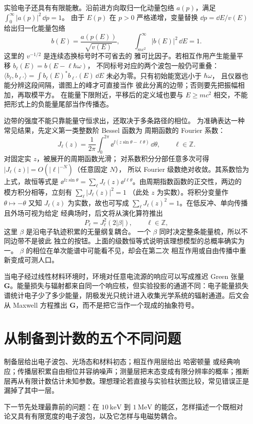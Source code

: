 实验电子还具有有限能散。沿前进方向取归一化动量包络
\(a(p)\)，满足 \(\int_0^\infty |a(p)|^2\,\dd p=1\)。
由于 \(E(p)\) 在 \(p>0\) 严格递增，变量替换
\(\dd p=\dd E/v(E)\) 给出归一化能量包络
\begin{equation}
b(E)=\frac{a(p(E))}{\sqrt{v(E)}},\qquad
\int_{mc^2}^{\infty}|b(E)|^2\,\dd E=1.
\label{eq:feqo-energy-envelope-normalization}
\end{equation}
这里的 \(v^{-1/2}\) 是连续态换标号时不可省去的
雅可比因子。若相互作用产生能量平移
\(b_\ell(E)=b(E-\ell\hbar\omega)\)，
不同标号对应的两个波包一般仍可重叠：
\(\langle b_\ell,b_{\ell'}\rangle
=\int b_\ell(E)^*b_{\ell'}(E)\,\dd E\)
未必为零。只有初始能宽远小于 \(\hbar\omega\)，
且仪器也能分辨这段间隔，谱图上的峰才可直接当作
彼此分离的边带；否则要先把振幅相加，再取模平方。
在能量下限附近，平移后的定义域也要与
\(E\ge mc^2\) 相交，不能把形式上的负能量尾部当作传播态。

边带的强度不能只靠能量守恒求出，还取决于多条路径的相位。
为准确表达一种常见结果，先定义第一类整数阶 Bessel 函数为
周期函数的 Fourier 系数：
\[
J_\ell(z)=\frac1{2\pi}\int_0^{2\pi}
\ee^{\ii(z\sin\theta-\ell\theta)}\,\dd\theta,
\qquad \ell\in\mathbb Z.
\]
对固定实 \(z\)，被展开的周期函数光滑；
对系数积分分部任意多次可得
\(|J_\ell(z)|=O(|\ell|^{-N})\)（任意固定 \(N\)），
所以 Fourier 级数绝对收敛。其系数恰为上式，故恒等式是
\(\ee^{\ii z\sin\theta}=\sum_\ell J_\ell(z)
\ee^{\ii\ell\theta}\)。由周期指数函数的正交性，两边的
模方积分相等，立刻有 \(\sum_\ell|J_\ell(z)|^2=1\)
（此处 \(z\) 为实数）。将积分变量作 \(\theta\mapsto-\theta\)
又知 \(J_\ell(z)\) 为实数，故也可写成
\(\sum_\ell J_\ell(z)^2=1\)。在低反冲、单向传播且外场可视为给定
经典场时，后文将从演化算符推出
\begin{equation}
P_\ell=J_\ell^2(2|\beta|),\qquad \ell\in\mathbb Z,
\label{eq:feqo-pinem-preview}
\end{equation}
这里 \(\beta\) 是沿电子轨迹积累的无量纲复耦合。
一个 \(\beta\) 同时决定整条能量梳，所以不同边带不是彼此
独立的按钮。上面的级数恒等式说明该理想模型的总概率确实为一。
\(\beta\) 的相位在单次能谱中可能看不见，却会在第二次
相互作用或自由传播中重新变成可测人口。

当电子经过线性材料环境时，环境对任意电流源的响应可以写成推迟 Green 张量 \(\mathbf G\)。能量损失与辐射都来自同一个响应核，但实验投影的通道不同：电子能量损失谱统计电子少了多少能量，阴极发光只统计进入收集光学系统的辐射通道。后文会从 Maxwell 方程推出 \(\mathbf G\)，而不是把它当作一个现成的抽象符号。

\section{从制备到计数的五个不同问题}

制备层给出电子波包、光场态和材料初态；相互作用层给出 哈密顿量 或经典响应；传播层积累自由相位并容纳噪声；测量层把末态变成有限分辨率的概率；推断层再从有限计数估计未知参数。理想理论若直接与实验柱状图比较，常见错误正是漏掉了其中一层。

下一节先处理最靠前的问题：在 \(\SI{10}{\kilo\electronvolt}\) 到 \(\SI{1}{\mega\electronvolt}\) 的能区，怎样描述一个既相对论又具有有限宽度的电子波包，以及它怎样与电磁势耦合。



